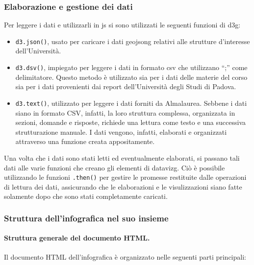 \subsubsection{Elaborazione e gestione dei dati}
Per leggere i dati e utilizzarli in \gls{js} si sono utilizzati le seguenti funzioni di \gls{d3g}:
\begin{itemize}
    \item \texttt{d3.json()}, usato per caricare i dati \gls{geojsong} relativi alle strutture d'interesse dell'Università.
    \item \texttt{d3.dsv()}, impiegato per leggere i dati in formato \gls{csv} che utilizzano ``;'' come delimitatore. 
    Questo metodo è utilizzato sia per i dati delle materie del corso sia per i dati provenienti dai report dell'Università degli Studi di Padova.
    \item \texttt{d3.text()}, utilizzato per leggere i dati forniti da Almalaurea. Sebbene i dati siano in formato CSV, infatti, la loro struttura complessa, 
    organizzata in sezioni, domande e risposte, richiede una lettura come testo e una successiva strutturazione manuale. 
    I dati vengono, infatti, elaborati e organizzati attraverso una funzione creata appositamente.
\end{itemize}
Una volta che i dati sono stati letti ed eventualmente elaborati, si passano tali dati alle varie funzioni che creano 
gli elementi di \gls{datavizg}. Ciò è possibile utilizzando le funzioni \texttt{.then()} per gestire le promesse restituite dalle operazioni 
di lettura dei dati, assicurando che le elaborazioni e le visulizzazioni siano fatte solamente dopo che sono stati completamente caricati. 


\subsubsection{Struttura dell'infografica nel suo insieme}
\paragraph{Struttura generale del documento HTML.} Il documento HTML dell'infografica è organizzato nelle seguenti parti principali:

